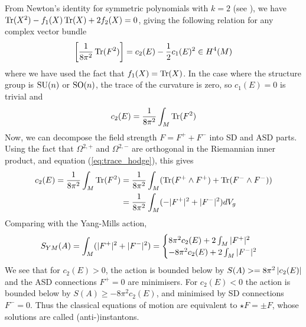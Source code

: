 From Newton's identity for symmetric polynomials with $k=2$ 
(see \cite[Theorem B.2]{loringtu}), we have $\operatorname{Tr}(X^2)-f_1(X)\operatorname{Tr}(X)+2f_2(X)=0$, 
giving the following relation for any complex vector bundle
\[ %
	\bracket{\frac{1}{8\pi^2} \Tr(F^2)} = c_2(E) - \frac{1}{2}c_1(E)^2 \in H^4(M)
\] 
where we have used the fact that $f_1(X)=\operatorname{Tr}(X)$. 
In the case where the structure group is $\operatorname{SU}(n)$ or $\operatorname{SO}(n)$, the trace of the
curvature is zero, so $c_1(E)=0$ is trivial and 
\[
c_2(E) = \frac{1}{8\pi^2}\int_M \operatorname{Tr}(F^2)
\] 
Now, we can
decompose the field strength $F = F^+ + F^-$ into SD and ASD 
parts. Using the fact that $\Omega^{2,+}$ and $\Omega^{2,-}$ are orthogonal in
the Riemannian inner product, and
equation (\ref{eq:trace_hodge}), this gives 
\begin{align*}
c_2(E)
= \frac{1}{8\pi^2}\int_M\Tr(F^2) 
&= \frac{1}{8\pi^2}\int_M(\Tr(F^{+}\wedge  F^{+}) + \Tr(F^{-}\wedge F^{-})) \\
&= \frac{1}{8\pi^2}\int_M(-\abs[*]{F^+}^2 + \abs[*]{F^-}^2) dV_g 
\end{align*}
Comparing with the Yang-Mills action, 
\begin{align*}
	S_{YM}(A) = \int_M (\abs[*]{F^+}^2+\abs[*]{F^-}^2) 
	= \begin{cases}
		8\pi^2 c_2(E) + 2\int_M \abs[*]{F^+}^2 \\
		-8\pi^2 c_2(E) + 2\int_M \abs[*]{F^-}^2
	\end{cases}
\end{align*}
We see that for $c_2(E)>0$, the action is bounded below by 
$S(A) >= 8\pi^2\abs{c_2(E)}$ and the ASD connections $F^+=0$ are
minimisers. For $c_2(E)<0$ the action is bounded
below by $S(A)\geq -8\pi^2c_2(E)$, and minimised by SD connections
$F^-=0$. 
Thus the classical equations of motion are equivalent to $\star F = \pm F$,
whose solutions are called (anti-)instantons. 
